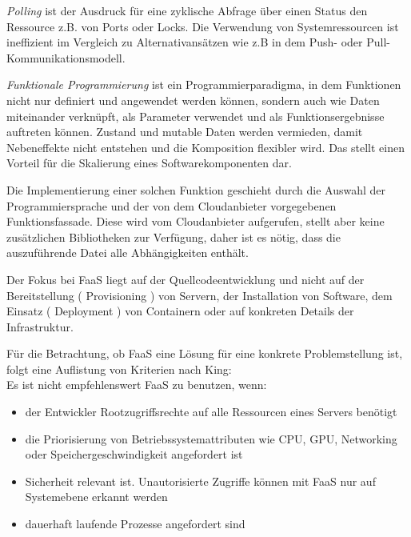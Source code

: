 \documentclass[
12pt,
english,
ngerman,
headsepline,
twoside,
openright,
numbers=noenddot,version=first
]{scrreprt}
\begin{document}
\textit{Polling}\label{par:polling} ist der Ausdruck für eine zyklische Abfrage über einen Status den Ressource z.B. von Ports oder Locks. Die Verwendung von Systemressourcen ist ineffizient im Vergleich zu Alternativansätzen wie z.B in dem Push- oder Pull- Kommunikationsmodell.\cite{lambdaAWS} 

\textit{Funktionale Programmierung} ist ein Programmierparadigma, in dem Funktionen nicht nur definiert und angewendet werden können, sondern auch wie Daten miteinander verknüpft, als Parameter verwendet und als Funktionsergebnisse auftreten können. Zustand und mutable Daten werden vermieden, damit Nebeneffekte nicht entstehen und die Komposition flexibler wird. Das stellt einen Vorteil für die Skalierung eines Softwarekomponenten dar.\cite{funcScala}


Die Implementierung einer solchen Funktion geschieht durch die Auswahl der Programmiersprache und der von dem Cloudanbieter vorgegebenen Funktionsfassade. Diese wird vom Cloudanbieter aufgerufen, stellt aber keine zusätzlichen Bibliotheken zur Verfügung, daher ist es nötig, dass die auszuführende Datei alle Abhängigkeiten enthält.


Der Fokus bei \acrshort{FaaS} liegt auf der Quellcodeentwicklung und nicht auf der Bereitstellung ( Provisioning ) von Servern, der Installation von Software, dem Einsatz ( Deployment ) von Containern oder auf konkreten Details der Infrastruktur.


Für die Betrachtung, ob \acrshort{FaaS} eine Lösung für eine konkrete Problemstellung ist, folgt eine Auflistung von Kriterien nach King\cite{lambdaAWS}:\\
Es ist nicht empfehlenswert \acrshort{FaaS} zu benutzen, wenn: \label{lambda-yes-no}
\begin{itemize}
	\item der Entwickler Rootzugriffsrechte auf alle Ressourcen eines Servers benötigt
	\item die Priorisierung von Betriebssystemattributen wie CPU, GPU, Networking oder Speichergeschwindigkeit angefordert ist
	\item Sicherheit relevant ist. Unautorisierte Zugriffe können mit \acrshort{FaaS} nur auf Systemebene erkannt werden
	\item dauerhaft laufende Prozesse angefordert sind
\end{itemize}
\end{document}
